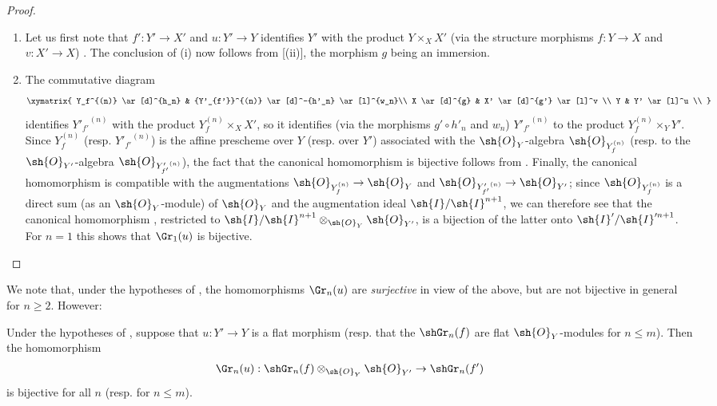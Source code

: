 \begin{proof}
\medskip\noindent
\begin{enumerate}
  \item[(i)] Let us first note that $f': Y' \to X'$ and $u: Y' \to Y$  identifies $Y'$ with the product $Y \times_X X'$ (via the structure morphisms $f:Y \to X$ and $v: X' \to X$) .
  The conclusion of (i) now follows from [(ii)], the morphism $g$ being an immersion.
  \item[(ii)] The commutative diagram
  \[
  \xymatrix{
    Y_f^{(n)} \ar[d]^{h_n}  & {Y'_{f'}}^{(n)} \ar[d]^-{h'_n} \ar[l]^{w_n}\\  
    X         \ar[d]^{g}    & X'              \ar[d]^{g'} \ar[l]^v \\  
    Y                       & Y' \ar[l]^u \\  
  }
  \]
  identifies ${Y'_{f'}}^{(n)}$ with the product $Y_f^{(n)} \times_X X'$, so  it identifies (via the morphisms $g'\circ h'_n$ and $w_n$) ${Y'_{f'}}^{(n)}$ to the product $Y_f^{(n)} \times_Y Y'$.
  Since $Y_f^{(n)}$ (resp. ${Y'_{f'}}^{(n)}$) is the affine prescheme over $Y$ (resp. over $Y'$) associated with the $\sh{O}_Y$-algebra $\sh{O}_{Y_f^{(n)}}$ (resp. to the $\sh{O}_{Y'}$-algebra $\sh{O}_{{Y'_{f'}}^{(n)}}$), the fact that the canonical homomorphism  is bijective follows from .
  Finally, the canonical homomorphism  is compatible with the augmentations $\sh{O}_{Y_f^{(n)}} \to \sh{O}_Y$ and $\sh{O}_{{Y'_{f'}}^{(n)}} \to \sh{O}_{Y'}$;
  since $\sh{O}_{Y_f^{(n)}}$ is a direct sum (as an $\sh{O}_Y$-module) of $\sh{O}_Y$ and the augmentation ideal $\sh{I}/\sh{I}^{n+1}$, we can therefore see that the canonical homomorphism , restricted to $\sh{I}/\sh{I}^{n+1} \otimes_{\sh{O}_Y} \sh{O}_{Y'}$, is a bijection of the latter onto $\sh{I}'/\sh{I}'^{n+1}$. For $n=1$ this shows that $\Gr_1(u)$ is bijective.
\end{enumerate}
\end{proof}

We note that, under the hypotheses of , the homomorphisms $\Gr_n(u)$ are \emph{surjective} in view of the above, but are not bijective in general for $n \geq 2$.
However:

\begin{corollary}[16.2.4]
\label{IV.16.2.4}
Under the hypotheses of , suppose that $u: Y' \to Y$ is a flat morphism (resp. that the $\shGr_n(f)$ are flat $\sh{O}_Y$-modules for $n \leq m$).
Then the homomorphism 
\[
  \Gr_n(u):\shGr_n(f) \otimes_{\sh{O}_Y}\sh{O}_{Y'} \to \shGr_n(f')
\]
is bijective for all $n$ (resp. for $n \leq m$).
\end{corollary}

